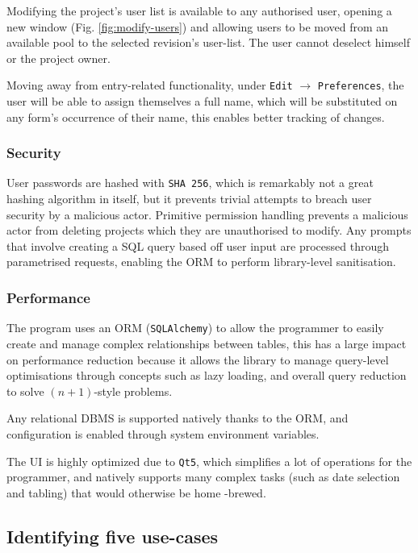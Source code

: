 \documentclass{report}
\begin{document}
	Modifying the project's user list is available to any authorised user, opening a new window (Fig. \ref{fig:modify-users})
	and allowing users to be moved from an available pool to the selected revision's user-list. The user cannot
	deselect himself or the project owner.
	
	Moving away from entry-related functionality, under \verb|Edit| $\rightarrow$ \verb|Preferences|, the user will
	be able to assign themselves a full name, which will be substituted on any form's occurrence of their name,
	this enables better tracking of changes.
	
	\newpage
	\subsubsection{Security}
	
	User passwords are hashed with \verb|SHA 256|, which is remarkably not a great hashing algorithm in itself,
	but it prevents trivial attempts to breach user security by a malicious actor. Primitive permission handling
	prevents a malicious actor from deleting projects which they are unauthorised to modify. Any prompts that
	involve creating a SQL query based off user input are processed through parametrised requests, enabling
	the ORM to perform library-level sanitisation.
	
	\subsubsection{Performance}
	
	The program uses an ORM (\verb|SQLAlchemy|) to allow the programmer to easily create and manage complex
	relationships between tables, this has a large impact on performance reduction because it allows the library
	to manage query-level optimisations through concepts such as lazy loading, and overall query reduction
	to solve $(n+1)$-style problems.
	
	Any relational DBMS is supported natively thanks to the ORM, and configuration is enabled through system
	environment variables.
	
	The UI is highly optimized due to \verb|Qt5|, which simplifies a lot of operations for the programmer, and 
	natively supports many complex tasks (such as date selection and tabling) that would otherwise be home
	-brewed.
	
	\subsection{Identifying five use-cases}
	
\end{document}
